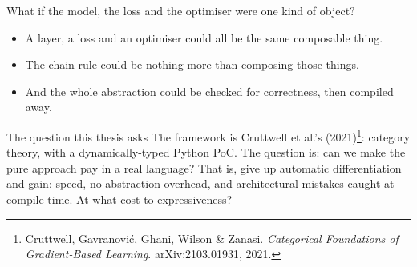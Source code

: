 \documentclass[aspectratio=169,11pt]{beamer}
\begin{document}
\begin{frame}{What if the model, the loss and the optimiser were one kind of object?}
  \begin{itemize}\setlength\itemsep{0.6em}
    \item A layer, a loss and an optimiser could all be the same composable thing.
    \item The chain rule could be nothing more than composing those things.
    \item And the whole abstraction could be checked for correctness, then compiled away.
  \end{itemize}
  \vspace{1em}
  \begin{block}{The question this thesis asks}
    The framework is Cruttwell et al.'s (2021)\footnote[frame]{Cruttwell, Gavranovi\'c, Ghani, Wilson \& Zanasi. \emph{Categorical Foundations of Gradient-Based Learning}. arXiv:2103.01931, 2021.}: category theory, with a dynamically-typed Python
    PoC. The question is: can we make the pure approach pay in a real language? That is, give up automatic differentiation and gain: speed, no abstraction overhead, and architectural mistakes caught at compile time. At what cost to expressiveness?
  \end{block}
\end{frame}
\end{document}
